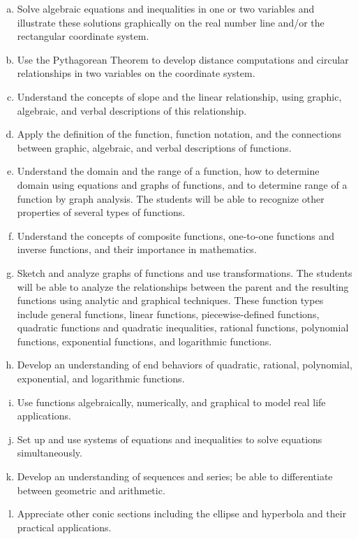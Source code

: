 \documentclass[12pt]{article}
\newcounter{on}\setcounter{on}{0}
\newcounter{ex}\setcounter{ex}{0}
\newenvironment{alphalist}{
  \begin{enumerate}[(a)]
    \addtolength{\itemsep}{-0.75\itemsep}}
  {\end{enumerate}}
\begin{document}
\begin{alphalist}

\item Solve algebraic equations and inequalities in one or two variables and illustrate these solutions graphically on the real number line and/or the rectangular coordinate system. 

\item Use the Pythagorean Theorem to develop distance computations and circular relationships in two variables on the coordinate system. 

\item   Understand the concepts of slope and the linear relationship, using graphic, algebraic, and verbal descriptions of this relationship. 

\item Apply the definition of the function, function notation, and the connections between graphic, algebraic, and verbal descriptions of functions. 

\item  Understand the domain and the range of a function, how to determine domain using equations and graphs of functions, and to determine range of a function by graph analysis. The students will be able to recognize other properties of several types of functions. 

\item   Understand the concepts of composite functions, one-to-one functions and inverse functions, and their importance in mathematics. 

\item  Sketch and analyze graphs of functions and use transformations.  The students will be able to analyze the relationships between the parent and the resulting functions using analytic and graphical techniques. These function types include general functions, linear functions, piecewise-defined functions, quadratic functions and quadratic inequalities, rational functions, polynomial functions, exponential functions, and logarithmic functions. 

\item   Develop an understanding of end behaviors of quadratic, rational, polynomial, exponential, and logarithmic functions. 

\item   Use functions algebraically, numerically, and graphical to model real life applications. 

\item   Set up and use systems of equations and inequalities to solve equations simultaneously.  

\item   Develop an understanding of sequences and series; be able to differentiate between geometric and arithmetic.  

\item   Appreciate other conic sections including the ellipse and hyperbola and their practical applications.  

\end{alphalist}
\end{document}
